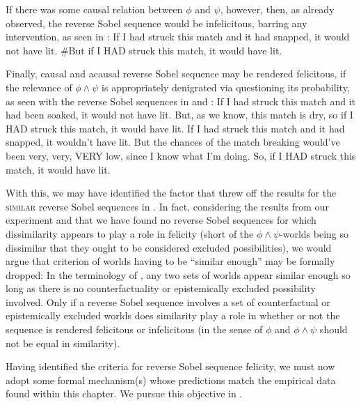 If there was some causal relation between $\phi$ and $\psi$, however, then, as \textcite{Klecha2014} already observed, the reverse Sobel sequence would be infelicitous, barring any intervention, as seen in :
\ex{}If I had struck this match and it had snapped, it would not have lit. \#But if I \MakeUppercase{had} struck this match, it would have lit.
\xe

Finally, causal and acausal reverse Sobel sequence may be rendered felicitous, if the relevance of $\phi\land\psi$ is appropriately denigrated via questioning its probability, as seen with the reverse Sobel sequences in  and :
\ex{}If I had struck this match and it had been soaked, it would not have lit. But, as we know, this match is dry, so if I \MakeUppercase{had} struck this match, it would have lit.
\xe
\ex{}If I had struck this match and it had snapped, it wouldn't have lit. But the chances of the match breaking would've been very, very, \MakeUppercase{very} low, since I know what I'm doing. So, if I \MakeUppercase{had} struck this match, it would have lit.
\xe

With this, we may have identified the factor that threw off the results for the {\scshape similar} reverse Sobel sequences in . In fact, considering the results from our experiment and that we have found no reverse Sobel sequences for which dissimilarity appears to play a role in felicity (short of the $\phi\land\psi$-worlds being so dissimilar that they ought to be considered excluded possibilities), we would argue that  criterion of worlds having to be \enquote{similar enough} may be formally dropped: In the terminology of \textcite{Lewis2018}, any two sets of worlds appear similar enough so long as there is no counterfactuality or epistemically excluded possibility involved. Only if a reverse Sobel sequence involves a set of counterfactual or epistemically excluded worlds does similarity play a role in whether or not the sequence is rendered felicitous or infelicitous (in the sense of $\phi$ and $\phi\land\psi$ should not be equal in similarity). 

Having identified the criteria for reverse Sobel sequence felicity, we must now adopt some formal mechanism(s) whose predictions match the empirical data found within this chapter. We pursue this objective in .
